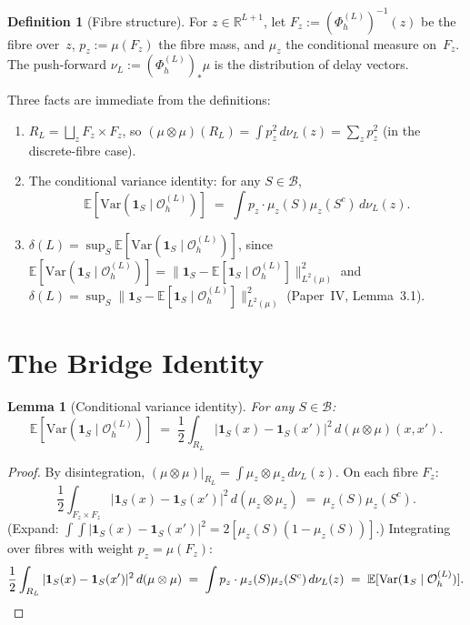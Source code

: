 \documentclass[11pt]{article}
\newtheorem{lemma}[theorem]{Lemma}
\theoremstyle{definition}
\newtheorem{definition}[theorem]{Definition}
\newcommand{\Bcal}{\mathcal{B}}
\newcommand{\OL}{\mathcal{O}_h^{(L)}}
\newcommand{\PhiL}{\Phi_h^{(L)}}
\newcommand{\Lp}[1]{L^{#1}}
\newcommand{\RL}{R_L}
\newcommand{\dL}{\delta(L)}
\begin{document}
\begin{definition}[Fibre structure]
For $z \in \mathbb{R}^{L+1}$, let $F_z := (\PhiL)^{-1}(z)$ be the fibre over~$z$,
$p_z := \mu(F_z)$ the fibre mass, and $\mu_z$ the conditional measure on~$F_z$.
The push-forward $\nu_L := (\PhiL)_*\!\mu$ is the distribution of delay vectors.
\end{definition}

Three facts are immediate from the definitions:
\begin{enumerate}[label=(\alph*)]
  \item $\RL = \bigsqcup_z F_z \times F_z$, so
    $(\mu \otimes \mu)(\RL) = \int p_z^2\, d\nu_L(z) = \sum_z p_z^2$
    (in the discrete-fibre case).
  \item The conditional variance identity:
    for any $S \in \Bcal$,
    \[
      \mathbb{E}[\mathrm{Var}(\mathbf{1}_S \mid \OL)]
      \;=\; \int p_z \cdot \mu_z(S)\mu_z(S^c)\, d\nu_L(z).
    \]
  \item $\dL = \sup_S \mathbb{E}[\mathrm{Var}(\mathbf{1}_S \mid \OL)]$,
    since $\mathbb{E}[\mathrm{Var}(\mathbf{1}_S \mid \OL)]
    = \|\mathbf{1}_S - \mathbb{E}[\mathbf{1}_S \mid \OL]\|_{\Lp{2}(\mu)}^2$
    and $\dL = \sup_S \|\mathbf{1}_S - \mathbb{E}[\mathbf{1}_S \mid \OL]\|_{\Lp{2}(\mu)}^2$
    (Paper~IV, Lemma~3.1).
\end{enumerate}

\section{The Bridge Identity}

\begin{lemma}[Conditional variance identity]
\label{lem:bridge}
For any $S \in \Bcal$:
\[
  \mathbb{E}[\mathrm{Var}(\mathbf{1}_S \mid \OL)]
  \;=\;
  \frac{1}{2}
  \int_{\RL} |\mathbf{1}_S(x) - \mathbf{1}_S(x')|^2\,
  d(\mu \otimes \mu)(x, x').
\]
\end{lemma}

\begin{proof}
By disintegration, $(\mu \otimes \mu)|_{\RL} = \int \mu_z \otimes \mu_z\, d\nu_L(z)$.
On each fibre $F_z$:
\[
  \frac{1}{2}\int_{F_z \times F_z}
  |\mathbf{1}_S(x) - \mathbf{1}_S(x')|^2\, d(\mu_z \otimes \mu_z)
  \;=\; \mu_z(S)\mu_z(S^c).
\]
(Expand: $\int\int |\mathbf{1}_S(x) - \mathbf{1}_S(x')|^2 = 2[\mu_z(S)(1-\mu_z(S))]$.)
Integrating over fibres with weight $p_z = \mu(F_z)$:
\[
  \frac{1}{2}\int_{\RL}|\mathbf{1}_S(x) - \mathbf{1}_S(x')|^2\,d(\mu\otimes\mu)
  \;=\; \int p_z \cdot \mu_z(S)\mu_z(S^c)\,d\nu_L(z)
  \;=\; \mathbb{E}[\mathrm{Var}(\mathbf{1}_S \mid \OL)]. \qedhere
\]
\end{proof}
\end{document}
